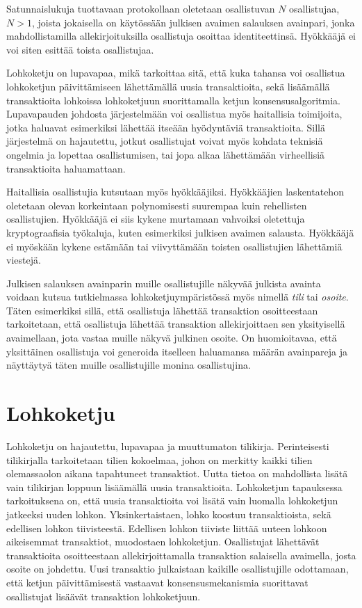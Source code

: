 Satunnaislukuja tuottavaan protokollaan oletetaan osallistuvan $N$ osallistujaa, $N > 1$, joista jokaisella on käytössään julkisen avaimen salauksen avainpari, jonka mahdollistamilla allekirjoituksilla osallistuja osoittaa identiteettinsä. Hyökkääjä ei voi siten esittää toista osallistujaa. 

Lohkoketju on lupavapaa, mikä tarkoittaa sitä, että kuka tahansa voi osallistua lohkoketjun päivittämiseen lähettämällä uusia transaktioita, sekä lisäämällä transaktioita lohkoissa lohkoketjuun suorittamalla ketjun konsensusalgoritmia. Lupavapauden johdosta järjestelmään voi osallistua myös haitallisia toimijoita, jotka haluavat esimerkiksi lähettää itseään hyödyntäviä transaktioita. Sillä järjestelmä on hajautettu, jotkut osallistujat voivat myös kohdata teknisiä ongelmia ja lopettaa osallistumisen, tai jopa alkaa lähettämään virheellisiä transaktioita haluamattaan.

Haitallisia osallistujia kutsutaan myös hyökkääjiksi. Hyökkääjien laskentatehon oletetaan olevan korkeintaan polynomisesti suurempaa kuin rehellisten osallistujien. Hyökkääjä ei siis kykene murtamaan vahvoiksi oletettuja kryptograafisia työkaluja, kuten esimerkiksi julkisen avaimen salausta. Hyökkääjä ei myöskään kykene estämään tai viivyttämään toisten osallistujien lähettämiä viestejä.

Julkisen salauksen avainparin muille osallistujille näkyvää julkista avainta voidaan kutsua tutkielmassa lohkoketjuympäristössä myös nimellä \textit{tili} tai \textit{osoite}. Täten esimerkiksi sillä, että osallistuja lähettää transaktion osoitteestaan tarkoitetaan, että osallistuja lähettää transaktion allekirjoittaen sen yksityisellä avaimellaan, jota vastaa muille näkyvä julkinen osoite. On huomioitavaa, että yksittäinen osallistuja voi generoida itselleen haluamansa määrän avainpareja ja näyttäytyä täten muille osallistujille monina osallistujina.

\section{Lohkoketju}

Lohkoketju on hajautettu, lupavapaa ja muuttumaton tilikirja. Perinteisesti tilikirjalla tarkoitetaan tilien kokoelmaa, johon on merkitty kaikki tilien olemassaolon aikana tapahtuneet transaktiot. Uutta tietoa on mahdollista lisätä vain tilikirjan loppuun lisäämällä uusia transaktioita. Lohkoketjun tapauksessa tarkoituksena on, että uusia  transaktioita voi lisätä vain luomalla lohkoketjun jatkeeksi uuden lohkon. Yksinkertaistaen, lohko koostuu transaktioista, sekä edellisen lohkon tiivisteestä. Edellisen lohkon tiiviste liittää uuteen lohkoon aikeisemmat transaktiot, muodostaen lohkoketjun. Osallistujat lähettävät transaktioita osoitteestaan allekirjoittamalla transaktion salaisella avaimella, josta osoite on johdettu. Uusi transaktio julkaistaan kaikille osallistujille odottamaan, että ketjun päivittämisestä vastaavat konsensusmekanismia suorittavat osallistujat lisäävät transaktion lohkoketjuun.

